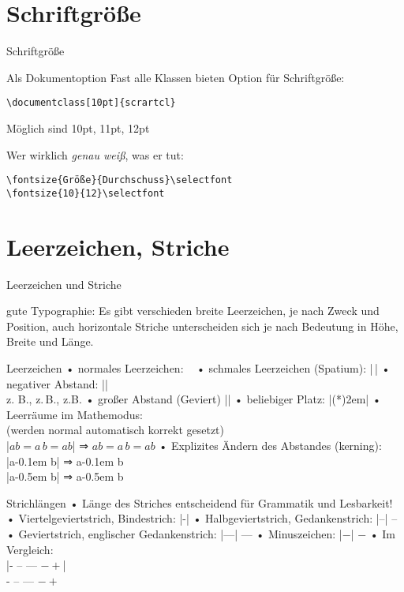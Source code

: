 \section{Schriftgröße}
\begin{frame}[fragile]{Schriftgröße}
\begin{block}{ Als Dokumentoption}
Fast alle Klassen bieten Option für Schriftgröße:
\begin{lstlisting}
\documentclass[10pt]{scrartcl}
\end{lstlisting}
Möglich sind 10pt, 11pt, 12pt
\end{block}\vspace{.4ex}\pause 
Wer wirklich \emph{genau weiß}, was er tut:
\begin{lstlisting}
\fontsize{Größe}{Durchschuss}\selectfont
\fontsize{10}{12}\selectfont
\end{lstlisting}
\end{frame}

\section{Leerzeichen, Striche}
\begin{frame}{Leerzeichen und Striche}
\begin{block}{gute Typographie:}
Es gibt verschieden breite Leerzeichen, je nach Zweck und Position,
auch horizontale Striche unterscheiden sich je nach Bedeutung in Höhe, Breite und Länge.
\end{block}
\end{frame}

\begin{frame}[fragile]{Leerzeichen}
• normales Leerzeichen: \verb*| |
• schmales Leerzeichen (Spatium): |\,|%
• negativer Abstand: |\!|
\\ z. B., z.\,B., z.\!B.%
• großer Abstand (Geviert) |\emspace|
• beliebiger Platz: |\hspace(*){2em}|
• Leerräume im Mathemodus:%
\\ (werden normal automatisch korrekt gesetzt)%
\\ |$a b = a\, b = a \! b$| ⇒ $a b = a\, b = a \! b$%
\pause
• Explizites Ändern des Abstandes (kerning):%
\\ |a\kern-0.1em b| ⇒ a\kern-0.1em b %
\\ |a\kern-0.5em b| ⇒ a\kern-0.5em b 
\• 
\end{frame}

\begin{frame}[fragile]{Strichlängen}
• Länge des Striches entscheidend für Grammatik und Lesbarkeit!
• Viertelgeviertstrich, Bindestrich: |-|
• Halbgeviertstrich, Gedankenstrich: |--| –
• Geviertstrich, englischer Gedankenstrich: |---| —
• Minuszeichen: |$-$| $-$
• Im Vergleich:%
\\ |- -- --- $- +$|%
\\ - – — $- +$%
\•\pause
\end{frame}

